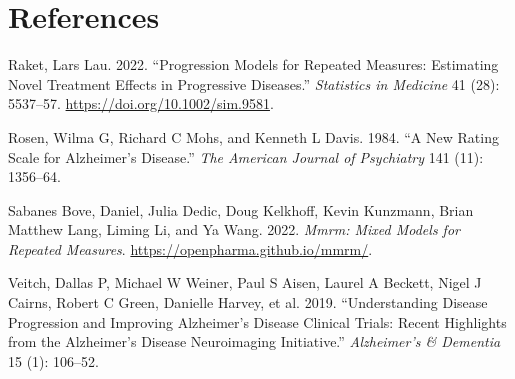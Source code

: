 \documentclass[
]{article}
\newlength{\cslhangindent}
\newlength{\cslentryspacingunit} %
\newenvironment{CSLReferences}[2] %
 {%
  \setlength{\parindent}{0pt}
  \ifodd #1
  \let\oldpar\par
  \def\par{\hangindent=\cslhangindent\oldpar}
  \fi
  \setlength{\parskip}{#2\cslentryspacingunit}
 }%
 {}
\begin{document}
\begin{table}
\begin{tabular}[t]{}
\hline
\\
\hline
\\
\hline
\\
\hline
\\
\hline
\\
\hline
\\
\hline
\\
\hline
\\
\hline
\\
\hline
\\
\hline
\\
\hline
\\
\hline
\\
\hline
\\
\hline
\\
\hline
\\
\hline
\\
\hline
\\
\hline
\\
\hline
\\
\hline
\end{tabular}
\end{table}

\hypertarget{references}{%
\section*{References}\label{references}}

\hypertarget{refs}{}
\begin{CSLReferences}{1}{0}
\leavevmode{}%
Raket, Lars Lau. 2022. {``Progression Models for Repeated Measures: {Estimating} Novel Treatment Effects in Progressive Diseases.''} \emph{Statistics in Medicine} 41 (28): 5537--57. \url{https://doi.org/10.1002/sim.9581}.

\leavevmode{}%
Rosen, Wilma G, Richard C Mohs, and Kenneth L Davis. 1984. {``A New Rating Scale for Alzheimer's Disease.''} \emph{The American Journal of Psychiatry} 141 (11): 1356--64.

\leavevmode{}%
Sabanes Bove, Daniel, Julia Dedic, Doug Kelkhoff, Kevin Kunzmann, Brian Matthew Lang, Liming Li, and Ya Wang. 2022. \emph{Mmrm: Mixed Models for Repeated Measures}. \url{https://openpharma.github.io/mmrm/}.

\leavevmode{}%
Veitch, Dallas P, Michael W Weiner, Paul S Aisen, Laurel A Beckett, Nigel J Cairns, Robert C Green, Danielle Harvey, et al. 2019. {``Understanding Disease Progression and Improving Alzheimer's Disease Clinical Trials: Recent Highlights from the Alzheimer's Disease Neuroimaging Initiative.''} \emph{Alzheimer's \& Dementia} 15 (1): 106--52.

\end{CSLReferences}
\end{document}

